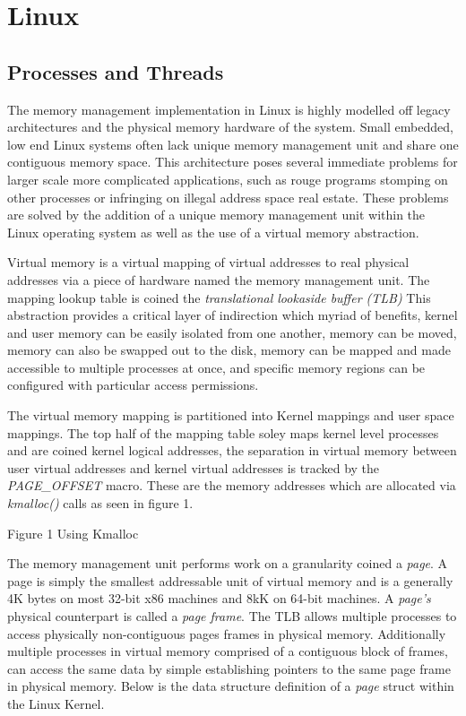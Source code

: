\section{\bf Linux}
  \subsection{\bf Processes and Threads}
    \normalfont \indent The memory management implementation in Linux is highly modelled off legacy architectures and the physical memory hardware of the system. Small embedded, low end Linux systems often lack unique memory management unit and share one contiguous memory space. This architecture poses several immediate problems for larger scale more complicated applications, such as rouge programs stomping on other processes or infringing on illegal address space real estate. These problems are solved by the addition of a unique memory management unit within the Linux operating system as well as the use of a virtual memory abstraction. 
	
	\normalfont \indent Virtual memory is a virtual mapping of virtual addresses to real physical addresses via a piece of hardware named the memory management unit. The mapping lookup table is coined the \textit{translational lookaside buffer (TLB)} This abstraction provides a critical layer of indirection which myriad of benefits, kernel and user memory can be easily isolated from one another, memory can be moved, memory can also be swapped out to the disk, memory can be mapped and made accessible to multiple processes at once, and specific memory regions can be configured with particular access permissions.\cite{}
	
	\normalfont \indent The virtual memory mapping is partitioned into Kernel mappings and user space mappings. The top half of the mapping table soley maps kernel level processes and are coined kernel logical addresses, the separation in virtual memory between user virtual addresses and kernel virtual addresses is tracked by the \textit{PAGE_OFFSET} macro. These are the memory addresses which are allocated via \textit{kmalloc()} calls as seen in figure 1. 
	

\begin{center}
Figure 1 Using Kmalloc  
\end{center}

      \normalfont \indent The memory management unit performs work on a granularity coined a \textit{page}. A page is simply the smallest addressable unit of virtual memory and is a generally 4K bytes on most 32-bit x86 machines and 8kK on 64-bit machines\cite{}. A \textit{page’s} physical counterpart is called a \textit{page frame}. The TLB allows multiple processes to access physically non-contiguous pages frames in physical memory. Additionally multiple processes in virtual memory comprised of a contiguous block of frames, can access the same data by simple establishing pointers to the same page frame in physical memory. Below is the data structure definition of a \textit{page} struct within the Linux Kernel.
	 
